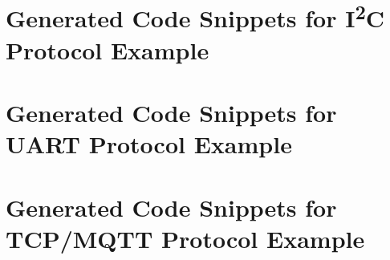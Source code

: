 
%




\chapter{Generated Code Snippets for I\textsuperscript{2}C Protocol Example}
\label{appendix:i2c}



\chapter{Generated Code Snippets for UART Protocol Example}
\label{appendix:uart}




\chapter{Generated Code Snippets for TCP/MQTT Protocol Example}
\label{appendix:tcp}


